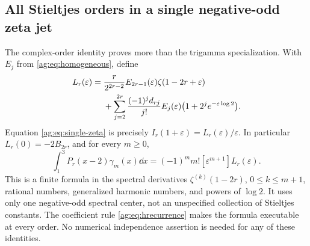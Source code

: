 \subsection{All Stieltjes orders in a single negative-odd zeta jet}
The complex-order identity proves more than the trigamma specialization.
With $E_j$ from \eqref{ag:eq:homogeneous}, define
\begin{align}
 L_r(\varepsilon)={}&
 \frac{r}{2^{2r-2}}E_{2r-1}(\varepsilon)
                              \zeta(1-2r+\varepsilon)\notag\\
 &+\sum_{j=2}^{2r}\frac{(-1)^jd_{rj}}{j!}
                  E_j(\varepsilon)\bigl(1+2^je^{-\varepsilon\log2}\bigr).
 \label{ag:eq:selector-L}
\end{align}
Equation \eqref{ag:eq:single-zeta} is precisely
$I_r(1+\varepsilon)=L_r(\varepsilon)/\varepsilon$.
In particular $L_r(0)=-2B_{2r}$, and for every $m\ge0$,
\begin{equation}\label{ag:eq:selector-Stieltjes}
 \boxed{
 \int_1^3P_r(x-2)\gamma_m(x)\dd x
       =(-1)^m m![\varepsilon^{m+1}]L_r(\varepsilon).}
\end{equation}
This is a finite formula in the spectral derivatives
$\zeta^{(k)}(1-2r)$, $0\le k\le m+1$, rational numbers,
generalized harmonic numbers, and powers of $\log2$. It uses only one
negative-odd spectral center, not an unspecified collection of
Stieltjes constants. The coefficient rule
\eqref{ag:eq:hrecurrence} makes the formula executable at every order.
No numerical independence assertion is needed for any of these identities.
